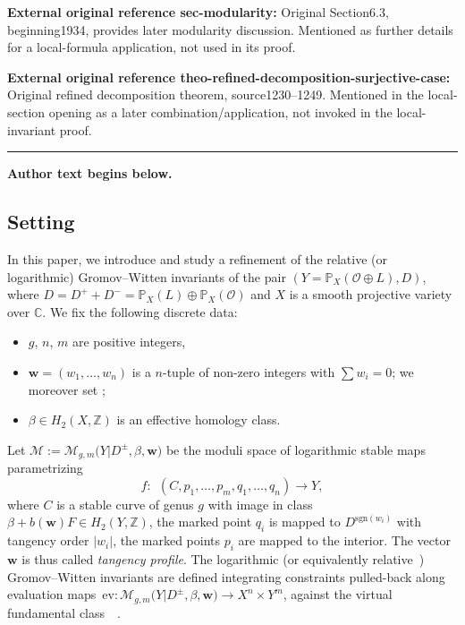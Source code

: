 \documentclass[11pt]{article}
\numberwithin{equation}{section}
\newcommand{\vir}[1]{\big[#1\big]^\mathrm{vir}}
\newcommand{\ev}{\mathrm{ev}}
\newcommand{\PP}{\mathbb{P}}
\newcommand{\ZZ}{\mathbb{Z}}
\newcommand{\bfw}{ {\boldsymbol w} }
\newcommand{\M}{\mathcal{M}}
\renewcommand{\O}{\mathcal{O}}
\numberwithin{equation}{section}
\theoremstyle{definition}
\begin{document}
\noindent\textbf{External original reference sec-modularity:} Original Section6.3, beginning1934, provides later modularity discussion. Mentioned as further details for a local-formula application, not used in its proof.\par
\noindent\textbf{External original reference theo-refined-decomposition-surjective-case:} Original refined decomposition theorem, source1230–1249. Mentioned in the local-section opening as a later combination/application, not invoked in the local-invariant proof.\par
\medskip\hrule\medskip\noindent\textbf{Author text begins below.}\par
\setcounter{section}{1}\setcounter{subsection}{0}
\subsection{Setting}

In this paper, we introduce and study a refinement of the relative (or logarithmic) Gromov--Witten invariants \cite{abramovich2014stable,gross2013logarithmic,kim2010logarithmic,li2001stable} of the pair $(Y=\PP_X(\O\oplus L),D)$, where $D=D^+ + D^-=\PP_X(L)\oplus\PP_X(\O)$ and $X$ is a smooth projective variety over $\mathbb C$. We fix the following discrete data:
\begin{itemize}\itemsep=0pt
 \item $g$, $n$, $m$ are positive integers,
 \item $\bfw=(w_1,\dots,w_n)$ is a $n$-tuple of non-zero integers with $\sum w_i=0$; we moreover set \smash{$b(\bfw)=\sum_{w_i>0}w_i=-\sum_{w_i<0}w_i$};
 \item $\beta\in H_2(X,\ZZ)$ is an effective homology class.
\end{itemize}
Let $\M:=\M_{g,m}\bigl(Y|D^{\pm},\beta,\bfw\bigr)$ be the moduli space of logarithmic stable maps parametrizing
\[
f\colon\ \ (C,p_1,\dots,p_m,q_1,\dots,q_n)\to Y,
 \]
where $C$ is a stable curve of genus $g$ with image in class $\beta+b(\bfw)F\in H_2(Y,\ZZ)$, the marked point $q_i$ is mapped to $D^{\mathrm{sgn}(w_i)}$ with tangency order $|w_i|$, the marked points $p_i$ are mapped to the interior. The vector $\bfw$ is thus called \textit{tangency profile}.
The logarithmic (or equivalently relative~\cite{abramovich2014comparison}) Gromov--Witten invariants are defined integrating constraints pulled-back along evaluation maps~${
\ev \colon \M_{g,m}\bigl(Y|D^{\pm},\beta,\bfw\bigr) \longrightarrow X^n\times Y^m}$,
 against the virtual fundamental class~\smash{$\vir{\M}$}~\cite{gross2013logarithmic}.
\end{document}
